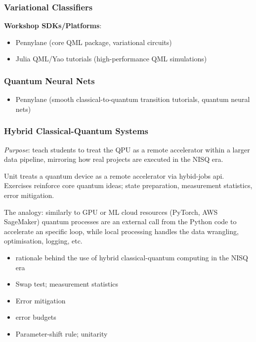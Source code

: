 \subsubsection*{Variational Classifiers}

\textbf{Workshop SDKs/Platforms}:
\begin{itemize}
	\item Pennylane (core QML package, variational circuits)
	\item Julia QML/Yao tutorials (high-performance QML simulations)
\end{itemize}

\subsubsection*{Quantum Neural Nets}
\begin{itemize}
	\item Pennylane (smooth classical-to-quantum transition tutorials, quantum neural nets)
\end{itemize}


\subsubsection*{Hybrid Classical-Quantum Systems}

\emph{Purpose}: teach students to treat the QPU as a remote accelerator within 
a larger data pipeline, mirroring how real projects are executed in the NISQ era.

Unit treats a quantum device as a remote accelerator via hybid-jobs api.
Exercises reinforce core quantum ideas; state preparation, measurement statistics, error mitigation.

The analogy: similarly to GPU or ML cloud resources (PyTorch, AWS SageMaker) 
quantum processes are an external call from the Python code to accelerate 
an specific loop, while local processing handles the data wrangling, optimisation, logging, etc.

\begin{itemize}
	\item rationale behind the use of hybrid classical-quantum computing in the NISQ era
	\item Swap test; measurement statistics
	\item Error mitigation
	\item error budgets
	\item Parameter-shift rule; unitarity	
\end{itemize}

